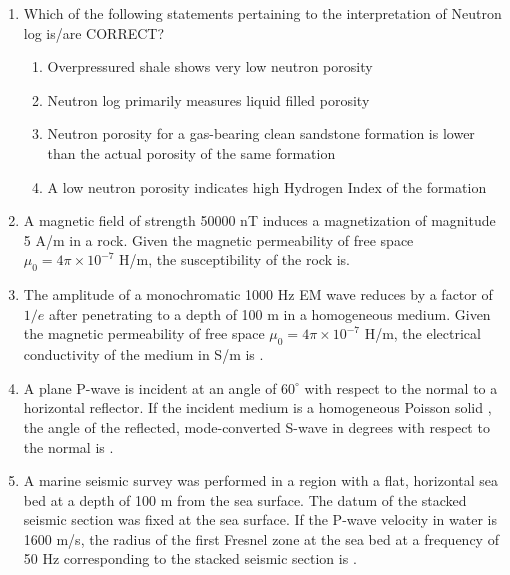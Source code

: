\documentclass[journal,12pt,onecolumn]{IEEEtran}
\begin{document}
\begin{enumerate}
\newpage

\item Which of the following statements pertaining to the interpretation of Neutron log is/are CORRECT?  

\hfill{}


\begin{enumerate}
\item Overpressured shale shows very low neutron porosity
\item Neutron log primarily measures liquid  filled porosity
\item Neutron porosity for a gas-bearing clean sandstone formation is lower than the actual porosity of the same formation
\item A low neutron porosity indicates high Hydrogen Index of the formation
\end{enumerate}


\item A magnetic field  of strength 50000 nT induces a magnetization  of magnitude 5 A/m in a rock. Given the magnetic permeability of free space $\mu_0=4\pi\times10^{-7}$ H/m, the susceptibility of the rock is.  

\hfill{}

\item The amplitude of a monochromatic 1000 Hz EM wave reduces by a factor of $1/e$ after penetrating to a depth of 100 m in a homogeneous medium. Given the magnetic permeability of free space $\mu_0=4\pi\times10^{-7}$ H/m, the electrical conductivity of the medium in S/m is .  

\hfill{}

\item A plane P-wave is incident at an angle of $60^\circ$ with respect to the normal to a horizontal reflector. If the incident medium is a homogeneous Poisson solid , the angle of the reflected, mode-converted S-wave in degrees with respect to the normal is   .  

\hfill{}

\item A marine seismic survey was performed in a region with a flat, horizontal sea bed at a depth of 100 m from the sea surface. The datum of the stacked seismic section was fixed at the sea surface. If the P-wave velocity in water is 1600 m/s, the radius of the first Fresnel zone at the sea bed at a frequency of 50 Hz corresponding to the stacked seismic section is  .  


\end{enumerate}
\end{document}
